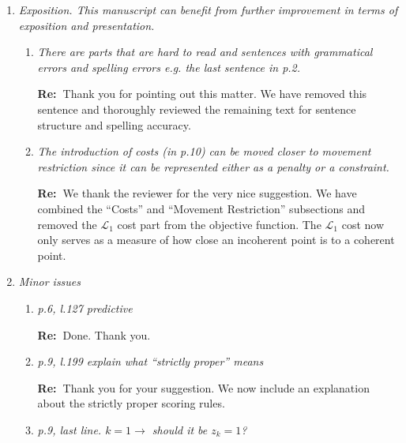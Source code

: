 \documentclass[11pt,a4paper]{article}
\newcommand{\RE}[2][Re:~]{{\color{blue}\textbf{#1}#2}}
\begin{document}
\begin{enumerate}
\RE{
  Thank you for your valuable feedback. In response, we have revised the Introduction Section to enhance clarity and logical flow. The revised version now presents a review of continuous reconciliation approaches in the second and third paragraphs. This is followed by a detailed discussion of the three primary motivations for our study, including a review of existing methodologies for count hierarchical time series. Lastly, we summarise our contributions to the field.  
}


\item \textit{Exposition. This manuscript can benefit from further improvement in terms of exposition and presentation. }
\begin{enumerate}
    \item \textit{There are parts that are hard to read and sentences with grammatical errors and spelling errors e.g. the last sentence in p.2.}
    
    \RE{Thank you for pointing out this matter. We have removed this sentence and thoroughly reviewed the remaining text for sentence structure and spelling accuracy.}
    \item \textit{The introduction of costs (in p.10) can be moved closer to movement restriction since it can be represented either as a penalty or a constraint.}
    
    \RE{We thank the reviewer for the very nice suggestion. We have combined the ``Costs'' and ``Movement Restriction'' subsections and removed the $\mathcal{L}_1$ cost part from the objective function. The $\mathcal{L}_1$ cost now only serves as a measure of how close an incoherent point is to a coherent point.}

\end{enumerate}




\item \textit{ Minor issues }

  \begin{enumerate}
    \item  \textit{p.6, l.127 predictive}

    \RE{Done. Thank you.}

    \item \textit{p.9, l.199 explain what ``strictly proper'' means}

    \RE{Thank you for your suggestion. We now include an explanation about the strictly proper scoring rules.}



    \item \textit{p.9, last line. $k = 1 \rightarrow$ should it be $z_k = 1$?}
    

\end{enumerate}
\end{enumerate}
\end{document}
